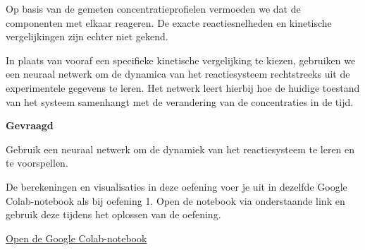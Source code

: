 \documentclass{ximera}
\begin{document}
Op basis van de gemeten concentratieprofielen vermoeden we dat de componenten met elkaar reageren. De exacte reactiesnelheden en kinetische vergelijkingen zijn echter niet gekend.

In plaats van vooraf een specifieke kinetische vergelijking te kiezen, gebruiken we een neuraal netwerk om de dynamica van het reactiesysteem rechtstreeks uit de experimentele gegevens te leren. Het netwerk leert hierbij hoe de huidige toestand van het systeem samenhangt met de verandering van de concentraties in de tijd.

\textbf{Gevraagd}

Gebruik een neuraal netwerk om de dynamiek van het reactiesysteem te leren en te voorspellen.

De berekeningen en visualisaties in deze oefening voer je uit in dezelfde Google Colab-notebook als bij oefening 1. Open de notebook via onderstaande link en gebruik deze tijdens het oplossen van de oefening.

\begin{center}
\href{https://colab.research.google.com/drive/17OMMkgFNeBZeORY04bA9OUqVQtMOB594?usp=sharing}
{\Large Open de Google Colab-notebook}
\end{center}
\end{document}
